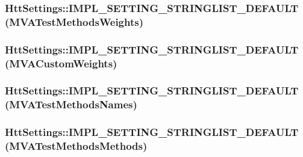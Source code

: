 \label{classHttSettings_adb48bb6048ea848b6bc172ece7304d2d}
\hypertarget{classHttSettings_af35f86b3b0858c95f367862b50249a90}{
\subsubsection[{IMPL\_\-SETTING\_\-STRINGLIST\_\-DEFAULT}]{\setlength{\rightskip}{0pt plus 5cm}HttSettings::IMPL\_\-SETTING\_\-STRINGLIST\_\-DEFAULT (MVATestMethodsWeights)}}
\label{classHttSettings_af35f86b3b0858c95f367862b50249a90}
\hypertarget{classHttSettings_a344986608f8f7a43084022c2ea3dbff7}{
\subsubsection[{IMPL\_\-SETTING\_\-STRINGLIST\_\-DEFAULT}]{\setlength{\rightskip}{0pt plus 5cm}HttSettings::IMPL\_\-SETTING\_\-STRINGLIST\_\-DEFAULT (MVACustomWeights)}}
\label{classHttSettings_a344986608f8f7a43084022c2ea3dbff7}
\hypertarget{classHttSettings_a89bebd29ec416dc09e1b25ecc07f1e45}{
\subsubsection[{IMPL\_\-SETTING\_\-STRINGLIST\_\-DEFAULT}]{\setlength{\rightskip}{0pt plus 5cm}HttSettings::IMPL\_\-SETTING\_\-STRINGLIST\_\-DEFAULT (MVATestMethodsNames)}}
\label{classHttSettings_a89bebd29ec416dc09e1b25ecc07f1e45}
\hypertarget{classHttSettings_a789b96782a5fc48e216ab8b19d39c099}{
\subsubsection[{IMPL\_\-SETTING\_\-STRINGLIST\_\-DEFAULT}]{\setlength{\rightskip}{0pt plus 5cm}HttSettings::IMPL\_\-SETTING\_\-STRINGLIST\_\-DEFAULT (MVATestMethodsMethods)}}
